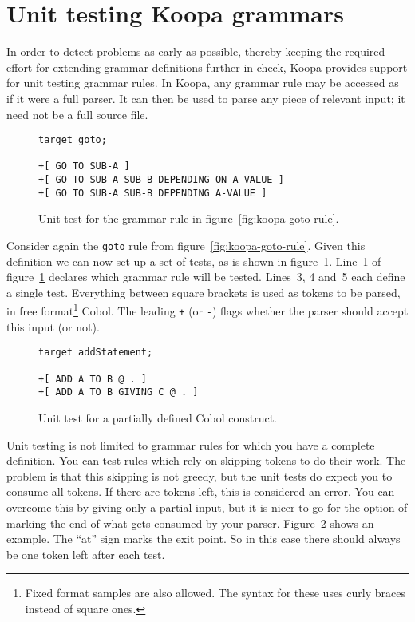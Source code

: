 \documentclass[a4paper]{article}
\begin{document}

\section{Unit testing Koopa grammars}
\label{testing}

In order to detect problems as early as possible, thereby keeping the required effort for extending grammar definitions further in check, Koopa provides support for unit testing grammar rules. In Koopa, any grammar rule may be accessed as if it were a full parser. It can then be used to parse any piece of relevant input; it need not be a full source file.

\begin{figure}
\centering
\begin{lstlisting}
target goto;

+[ GO TO SUB-A ]
+[ GO TO SUB-A SUB-B DEPENDING ON A-VALUE ]
+[ GO TO SUB-A SUB-B DEPENDING A-VALUE ]
\end{lstlisting}
\caption{Unit test for the grammar rule in figure~\ref{fig:koopa-goto-rule}.}
\label{fig:koopa-goto-test}
\end{figure}

Consider again the \lstinline|goto| rule from figure~\ref{fig:koopa-goto-rule}. Given this definition we can now set up a set of tests, as is shown in figure~\ref{fig:koopa-goto-test}. Line~1 of figure~\ref{fig:koopa-goto-test} declares which grammar rule will be tested. Lines~3, 4 and~5 each define a single test. Everything between square brackets is used as tokens to be parsed, in free format\footnote{\scriptsize Fixed format samples are also allowed. The syntax for these uses curly braces instead of square ones.} Cobol. The leading \lstinline|+| (or \lstinline|-|) flags whether the parser should accept this input (or not).

\begin{figure}
\centering
\begin{lstlisting}
target addStatement;

+[ ADD A TO B @ . ]
+[ ADD A TO B GIVING C @ . ]
\end{lstlisting}
\caption{Unit test for a partially defined Cobol construct.}
\label{fig:koopa-test-with-marker}
\end{figure}

Unit testing is not limited to grammar rules for which you have a complete definition. You can test rules which rely on skipping tokens to do their work. The problem is that this skipping is not greedy, but the unit tests do expect you to consume all tokens. If there are tokens left, this is considered an error. You can overcome this by giving only a partial input, but it is nicer to go for the option of marking the end of what gets consumed by your parser. Figure~\ref{fig:koopa-test-with-marker} shows an example. The ``at'' sign marks the exit point. So in this case there should always be one token left after each test.
\end{document}
